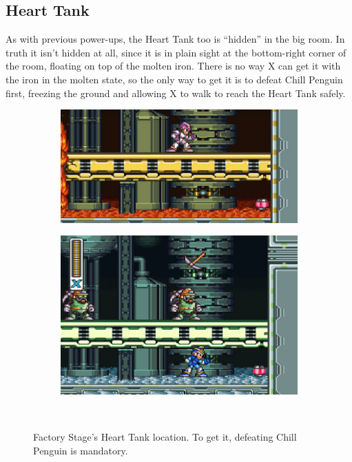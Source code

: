 \subsection{Heart Tank}
As with  previous power-ups, the Heart Tank too is ``hidden'' in the big room. In truth it isn't hidden at all, since it is in plain sight at the bottom-right corner of the room, floating on top of the molten iron. There is no way X can get it with the iron in the molten state, so the only way to get it is to defeat Chill Penguin first, freezing the ground and allowing X to walk to reach the Heart Tank safely.

\begin{figure}[htp]
	\centering
	\begin{subfigure}{0.49\textwidth}
		\centering
		\includegraphics[width=\linewidth]{figures/X1/Flame_mammoth/Flame_heart_1.jpg}
		\caption{}
	\end{subfigure}
	\begin{subfigure}{0.4\textwidth}
		\centering
		\includegraphics[width=\linewidth]{figures/X1/Flame_mammoth/Flame_heart_2.jpg}
		\caption{}
	\end{subfigure}\\
	\caption{Factory Stage's Heart Tank location. To get it, defeating Chill Penguin is mandatory.}
\end{figure}

